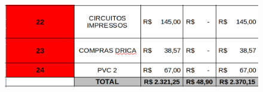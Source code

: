 \begin{figure}[H]
	\centering
	\includegraphics[width=16cm]{figuras/orcamento-3.png}
	\caption{}
\end{figure}

